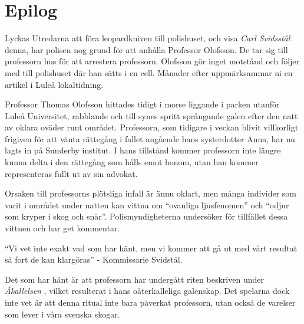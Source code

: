 \section{Epilog}
Lyckas Utredarna att föra leopardkniven till polishuset, och visa \textit{Carl Svidsstål} 
\sectiondescribe{\ref{kar:KonstapelCarlSvidstal}} denna, har polisen nog grund för att anhålla 
Professor Olofsson. De tar sig till professorn hus för att arrestera professorn. Olofsson gör 
inget motstånd och följer med till polishuset där han sätts i en cell. Månader efter 
uppmärksammar ni en artikel i Luleå lokaltidning.

\begin{displayquote}
	Professor Thomas Olofsson hittades tidigt i morse liggande i parken utanför Luleå Universitet,
	rabblande och till synes spritt språngande galen efter den natt av oklara oväder runt området.
	Professorn, som tidigare i veckan blivit villkorligt frigiven för att vänta rättegång i fallet 
	angående hans systerdotter Anna, har nu lagts in på Sunderby institut. I hans tillstånd kommer
	professorn inte längre kunna delta i den rättegång som hålls emot honom, utan han kommer
	representeras fullt ut av sin advokat.

	Orsaken till professorns plötsliga infall är ännu oklart, men många individer som varit i 
	området under natten kan vittna om ``ovanliga ljusfenomen'' och ``odjur som kryper i 
	skog och snår''. Polismyndigheterna undersöker för tillfället dessa vittnen och har get 
	kommentar. 

	``Vi vet inte exakt vad som har hänt, men vi kommer att gå ut med vårt resultat så fort de 
	kan klargöras'' - Kommissarie Svidstål.
\end{displayquote}

Det som har hänt är att professorn har undergått riten beskriven under \textit{Åkallelsen} 
\sectiondescribe{\ref{sek:Akallelsen}}, vilket resulterat i hans oåterkalleliga galenskap.
Det spelarna dock inte vet är att denna ritual inte bara påverkat professorn, utan också 
de varelser som lever i våra svenska skogar.
